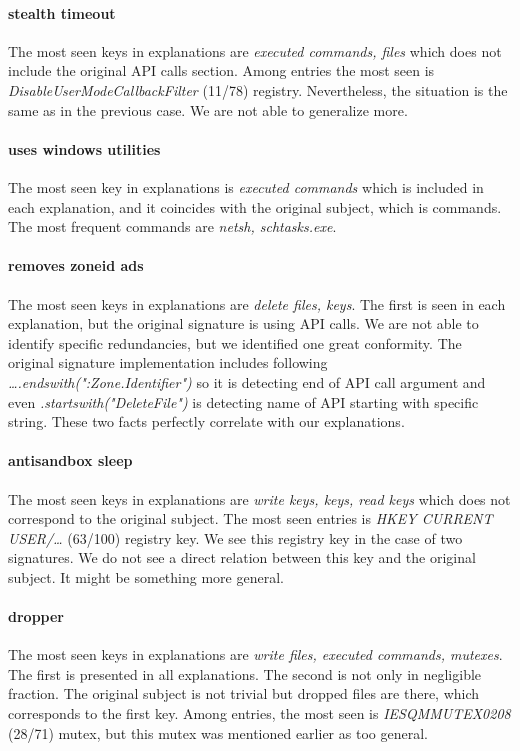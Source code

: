 \paragraph{stealth timeout}
The most seen keys in explanations are \emph{executed commands, files} which does not include the original API calls section. Among entries the most seen is \emph{DisableUserModeCallbackFilter} (11/78) registry. Nevertheless, the situation is the same as in the previous case. We are not able to generalize more.

\paragraph{uses windows utilities}
The most seen key in explanations is \emph{executed commands} which is included in each explanation, and it coincides with the original subject, which is commands. The most frequent commands are \emph{netsh, schtasks.exe}.

\paragraph{removes zoneid ads}
The most seen keys in explanations are \emph{delete files, keys}. The first is seen in each explanation, but the original signature is using API calls. We are not able to identify specific redundancies, but we identified one great conformity. The original signature implementation includes following \emph{\dots .endswith(":Zone.Identifier")} so it is detecting end of API call argument and even \emph{.startswith("DeleteFile")} is detecting name of API starting with specific string. These two facts perfectly correlate with our explanations.

\paragraph{antisandbox sleep}
The most seen keys in explanations are \emph{write keys, keys, read keys} which does not correspond to the original subject. The most seen entries is \emph{HKEY CURRENT USER/\dots} (63/100) registry key. We see this registry key in the case of two signatures. We do not see a direct relation between this key and the original subject. It might be something more general.

\paragraph{dropper}
The most seen keys in explanations are \emph{write files, executed commands, mutexes}. The first is presented in all explanations. The second is not only in negligible fraction. The original subject is not trivial but dropped files are there, which corresponds to the first key. Among entries, the most seen is \emph{IESQMMUTEX0208} (28/71) mutex, but this mutex was mentioned earlier as too general.

